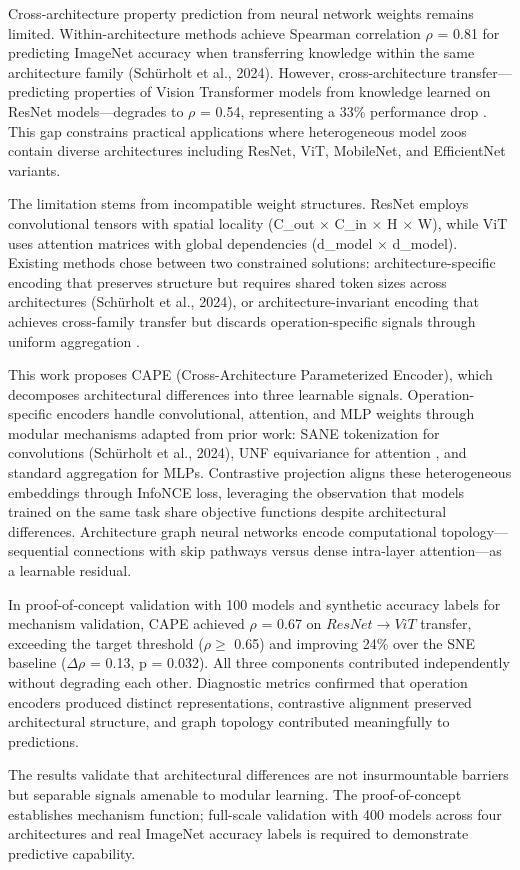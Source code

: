 
Cross-architecture property prediction from neural network weights remains limited. Within-architecture methods achieve Spearman correlation $\rho$ = 0.81 for predicting ImageNet accuracy when transferring knowledge within the same architecture family (Schürholt et al., 2024). However, cross-architecture transfer---predicting properties of Vision Transformer models from knowledge learned on ResNet models---degrades to $\rho$ = 0.54, representing a 33\% performance drop \citep{Andreis2023}. This gap constrains practical applications where heterogeneous model zoos contain diverse architectures including ResNet, ViT, MobileNet, and EfficientNet variants.

The limitation stems from incompatible weight structures. ResNet employs convolutional tensors with spatial locality (C\_out $\times$ C\_in $\times$ H $\times$ W), while ViT uses attention matrices with global dependencies (d\_model $\times$ d\_model). Existing methods chose between two constrained solutions: architecture-specific encoding that preserves structure but requires shared token sizes across architectures (Schürholt et al., 2024), or architecture-invariant encoding that achieves cross-family transfer but discards operation-specific signals through uniform aggregation \citep{Andreis2023}.

This work proposes CAPE (Cross-Architecture Parameterized Encoder), which decomposes architectural differences into three learnable signals. Operation-specific encoders handle convolutional, attention, and MLP weights through modular mechanisms adapted from prior work: SANE tokenization for convolutions (Schürholt et al., 2024), UNF equivariance for attention \citep{Zhou2024}, and standard aggregation for MLPs. Contrastive projection aligns these heterogeneous embeddings through InfoNCE loss, leveraging the observation that models trained on the same task share objective functions despite architectural differences. Architecture graph neural networks encode computational topology---sequential connections with skip pathways versus dense intra-layer attention---as a learnable residual.

In proof-of-concept validation with 100 models and synthetic accuracy labels for mechanism validation, CAPE achieved $\rho$ = 0.67 on $ResNet\rightarrow ViT$ transfer, exceeding the target threshold ($\rho \geq$ 0.65) and improving 24\% over the SNE baseline ($\Delta\rho$ = 0.13, p = 0.032). All three components contributed independently without degrading each other. Diagnostic metrics confirmed that operation encoders produced distinct representations, contrastive alignment preserved architectural structure, and graph topology contributed meaningfully to predictions.

The results validate that architectural differences are not insurmountable barriers but separable signals amenable to modular learning. The proof-of-concept establishes mechanism function; full-scale validation with 400 models across four architectures and real ImageNet accuracy labels is required to demonstrate predictive capability.
